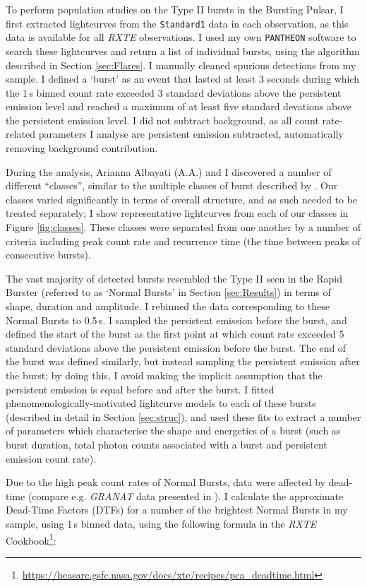 \par To perform population studies on the Type II bursts in the Bursting Pulsar, I first extracted lightcurves from the \texttt{Standard1} data in each observation, as this data is available for all \textit{RXTE} observations.  I used my own \texttt{PANTHEON} software to search these lightcurves and return a list of individual bursts, using the algorithm described in Section \ref{sec:Flares}.  I manually cleaned spurious detections from my sample.  I defined a `burst' as an event that lasted at least 3 seconds during which the 1\,s binned count rate exceeded 3 standard deviations above the persistent emission level and reached a maximum of at least five standard devations above the persistent emission level.  I did not subtract background, as all count rate-related parameters I analyse are persistent emission subtracted, automatically removing background contribution.
\par During the analysis, Arianna Albayati (\textsf{A.A.}) and I discovered a number of different ``classes'', similar to the multiple classes of burst described by \citet{Giles_BP}.  Our classes varied significantly in terms of overall structure, and as such needed to be treated separately; I show representative lightcurves from each of our classes in Figure \ref{fig:classes}.  These classes were separated from one another by a number of criteria including peak count rate and recurrence time (the time between peaks of consecutive bursts).
\par The vast majority of detected bursts resembled the Type II seen in the Rapid Burster (referred to as `Normal Bursts' in Section \ref{sec:Results}) in terms of shape, duration and amplitude.  I rebinned the data corresponding to these Normal Bursts to 0.5\,s.  I sampled the persistent emission before the burst, and defined the start of the burst as the first point at which count rate exceeded 5 standard deviations above the persistent emission before the burst.  The end of the burst was defined similarly, but instead sampling the persistent emission after the burst; by doing this, I avoid making the implicit assumption that the persistent emission is equal before and after the burst.  I fitted phenomenologically-motivated lightcurve models to each of these bursts (described in detail in Section \ref{sec:struc}), and used these fits to extract a number of parameters which characterise the shape and energetics of a burst (such as burst duration, total photon counts associated with a burst and persistent emission count rate).
\par Due to the high peak count rates of Normal Bursts, data were affected by dead-time (compare e.g. \textit{GRANAT} data presented in \citealp{Sazonov_BPGranat}).  I calculate the approximate Dead-Time Factors (DTFs) for a number of the brightest Normal Bursts in my sample, using 1\,s binned data, using the following formula in the \textit{RXTE} Cookbook\footnote{\url{https://heasarc.gsfc.nasa.gov/docs/xte/recipes/pca_deadtime.html}}:
